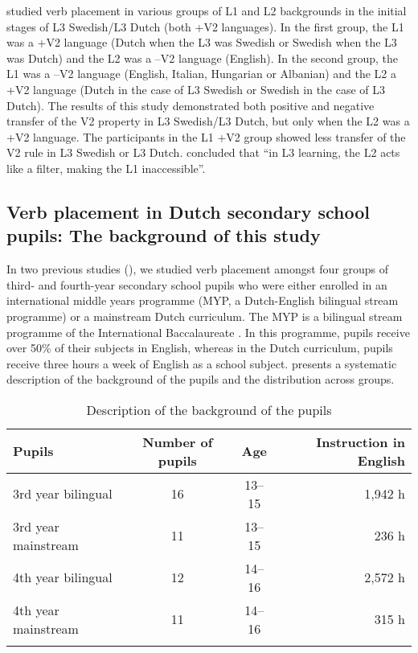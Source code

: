 \documentclass[output=paper]{langsci/langscibook}
\begin{document}
\citet{BardelFalk2007} studied verb placement in various groups of L1 and L2 backgrounds in the initial stages of L3 Swedish/L3 Dutch (both +V2 languages). In the first group, the L1 was a +V2 language (Dutch when the L3 was Swedish or Swedish when the L3 was Dutch) and the L2 was a –V2 language (English). In the second group, the L1 was a –V2 language (English, Italian, Hungarian or Albanian) and the L2 a +V2 language (Dutch in the case of L3 Swedish or Swedish in the case of L3 Dutch). The results of this study demonstrated both positive and negative transfer of the V2 property in L3 Swedish/L3 Dutch, but only when the L2 was a +V2 language. The participants in the L1 +V2 group showed less transfer of the V2 rule in L3 Swedish or L3 Dutch. \citet[480]{BardelFalk2007} concluded that “in L3 learning, the L2 acts like a filter, making the L1 inaccessible”.

\subsection{{Verb placement in Dutch secondary school pupils: The background of this study}}%
\label{sec:stadt:2.3}\largerpage

In two previous studies (\citealt{StadtEtAl2016, StadtEtAl2018Exposure}), we studied verb placement amongst four groups of third- and fourth-year secondary school pupils who were either enrolled in an international middle years programme (MYP, a Dutch-English bilingual stream programme) or a mainstream Dutch curriculum. The MYP is a bilingual stream programme of the International Baccalaureate \citep{IBO2019}. In this programme, pupils receive over 50\% of their subjects in English, whereas in the Dutch curriculum, pupils receive three hours a week of English as a school subject.  presents a systematic description of the background of the pupils and the distribution across groups.

\begin{table}
\caption{Description of the background of the pupils\label{tab:stadt:1}}
\begin{tabular}{l c c r}
\lsptoprule
Pupils &  Number of pupils & Age & Instruction in English\\
	\midrule
3rd year bilingual &  16 & 13--15 & 1,942 h\\
3rd year mainstream &  11 & 13--15 & 236 h\\
4th year bilingual &   12 & 14--16 & 2,572 h\\
4th year mainstream &  11 & 14--16 & 315 h\\
\lspbottomrule
\end{tabular}
\end{table}
\end{document}
